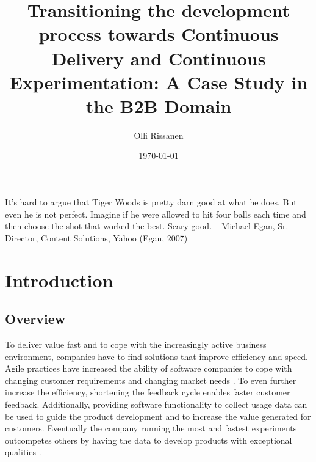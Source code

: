 \documentclass[english]{tktltiki2}
\title{Transitioning the development process towards Continuous Delivery and Continuous Experimentation: A Case Study in the B2B Domain}
\author{Olli Rissanen}
\date{\today}
\theoremstyle{definition}
\theoremstyle{remark}
\begin{document}

\frontmatter      %

\maketitle        %
\makeabstract     %

\tableofcontents  %


\newpage

It’s hard to argue that Tiger Woods is pretty darn good at what he does. But even he is not perfect. Imagine if
he were allowed to hit four balls each time and then choose the shot that worked the best. Scary good.
-- Michael Egan, Sr. Director, Content Solutions, Yahoo (Egan, 2007)

\mainmatter       %




\section{Introduction} %

\subsection{Overview}
To deliver value fast and to cope with the increasingly active business environment, companies have to find solutions that improve efficiency and speed. Agile practices \cite{cockburn2002agile} have increased the ability of software companies to cope with changing customer requirements and changing market needs \cite{dzamashvili2010impact}. To even further increase the efficiency, shortening the feedback cycle enables faster customer feedback. Additionally, providing software functionality to collect usage data can be used to guide the product development and to increase the value generated for customers. Eventually the company running the most and fastest experiments outcompetes others by having the data to develop products with exceptional qualities \cite{eklund2012architecture}.
\end{document}
